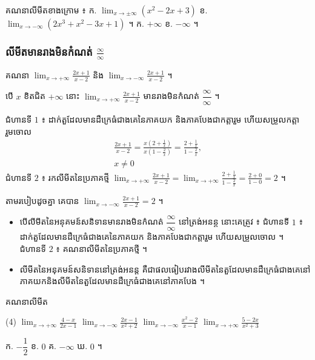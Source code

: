 \begin{pro}
គណនាលីមីតខាងក្រោម ៖ \quad ក. $\displaystyle\lim_{x \to \pm\infty}(x^2 - 2x + 3)$ \quad ខ. $\displaystyle\lim_{x \to -\infty}(2x^3 + x^2 - 3x + 1)$ ។
\ans
ក. $+\infty$ \quad ខ. $-\infty$ ។
\end{pro}

\subsubsection{លីមីតមានរាងមិនកំណត់ \texorpdfstring{$\frac{\infty}{\infty}$}{inf/inf}}

\begin{example}[ឧទាហរណ៍]
គណនា $\displaystyle\lim_{x \to +\infty}\frac{2x + 1}{x - 2}$ និង $\displaystyle\lim_{x \to -\infty}\frac{2x + 1}{x - 2}$ ។
\end{example}
បើ $x$ ខិតជិត $+\infty$ នោះ $\displaystyle\lim_{x \to +\infty}\frac{2x + 1}{x - 2}$ មានរាងមិនកំណត់ $\dfrac{\infty}{\infty}$ ។

ជំហានទី $1$ ៖ ដាក់តួដែលមានដឺក្រេធំជាងគេនៃភាគយក និងភាគបែងជាកត្តារួម ហើយសម្រួលកត្តារួមចោល
\[
\begin{gathered}
\frac{2x + 1}{x - 2} = \frac{x\left(2 + \frac{1}{x}\right)}{x\left(1 - \frac{2}{x}\right)} = \frac{2 + \frac{1}{x}}{1 - \frac{2}{x}},\\
x \ne 0
\end{gathered}
\]
ជំហានទី $2$ ៖ រកលីមីតនៃប្រភាគថ្មី $\displaystyle\lim_{x \to +\infty}\frac{2x + 1}{x - 2} = \lim_{x \to +\infty}\frac{2 + \frac{1}{x}}{1 - \frac{2}{x}} = \frac{2 + 0}{1 - 0} = 2$ ។

តាមរបៀបដូចគ្នា គេបាន $\displaystyle\lim_{x \to -\infty}\frac{2x + 1}{x - 2} = 2$ ។

\begin{formulaBox}[ជាទូទៅ]
\begin{itemize}
  \item បើលីមីតនៃអនុគមន៍សនិទានមានរាងមិនកំណត់ $\dfrac{\infty}{\infty}$ នៅត្រង់អនន្ត នោះគេត្រូវ ៖ ជំហានទី $1$ ៖ ដាក់តួដែលមានដឺក្រេធំជាងគេនៃភាគយក និងភាគបែងជាកត្តារួម ហើយសម្រួលចោល ។ ជំហានទី $2$ ៖ គណនាលីមីតនៃប្រភាគថ្មី ។
  \item លីមីតនៃអនុគមន៍សនិទាននៅត្រង់អនន្ត គឺជាផលធៀបរវាងលីមីតនៃតួដែលមានដឺក្រេធំជាងគេនៅភាគយកនិងលីមីតនៃតួដែលមានដឺក្រេធំជាងគេនៅភាគបែង ។
\end{itemize}
\end{formulaBox}

\begin{pro}
គណនាលីមីត
\begin{tasks}(4)
  \task $\displaystyle\lim_{x \to +\infty}\frac{4 - x}{2x - 1}$
  \task $\displaystyle\lim_{x \to -\infty}\frac{2x - 1}{x^2 + 2}$
  \task $\displaystyle\lim_{x \to -\infty}\frac{x^2 - 2}{x - 1}$
  \task $\displaystyle\lim_{x \to +\infty}\frac{5 - 2x}{x^2 + 3}$
\end{tasks}
\ans
ក. $-\dfrac{1}{2}$ \quad ខ. $0$ \quad គ. $-\infty$ \quad ឃ. $0$ ។
\end{pro}


